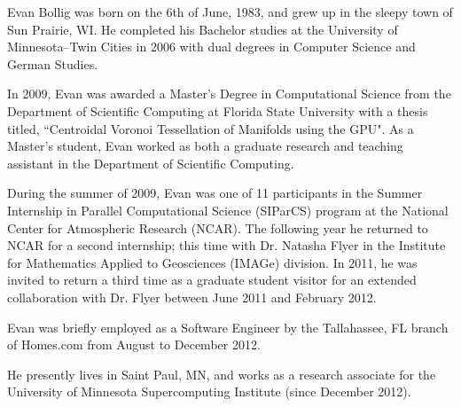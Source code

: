 \begin{biosketch}

Evan Bollig was born on the 6th of June, 1983, and grew up in the sleepy town of Sun Prairie, WI. He completed his Bachelor studies at the University of Minnesota--Twin Cities in 2006 with dual degrees in Computer Science and German Studies. 

In 2009, Evan was awarded a Master's Degree in Computational Science from the Department of Scientific Computing at Florida State University with a thesis titled, ``Centroidal Voronoi Tessellation of Manifolds using the GPU". As a Master's student, Evan worked as both a graduate research and teaching assistant in the Department of Scientific Computing.

During the summer of 2009, Evan was one of 11 participants in the Summer Internship in Parallel Computational Science (SIParCS) program at the National Center for Atmospheric Research (NCAR). The following year he returned to NCAR for a second internship; this time with Dr. Natasha Flyer in the Institute for Mathematics Applied to Geosciences (IMAGe) division. In 2011, he was invited to return a third time as a graduate student visitor for an extended collaboration with Dr. Flyer between June 2011 and February 2012. 

Evan was briefly employed as a Software Engineer by the Tallahassee, FL branch of Homes.com from August to December 2012. 

He presently lives in Saint Paul, MN, and works as a research associate for the University of Minnesota Supercomputing Institute (since December 2012). 


\end{biosketch}